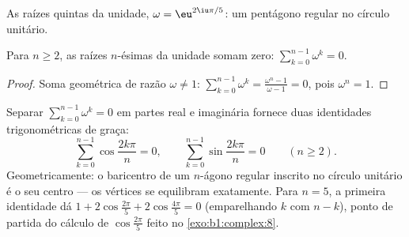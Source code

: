 \begin{omfigure}

{\small As raízes quintas da unidade, $\omega = \eu^{2\iu\pi/5}$: um
pentágono regular no círculo unitário.}
\end{omfigure}

\begin{proposition}\label{prop:b1:complex:sumroots}
Para $n \geq 2$, as raízes $n$-ésimas da unidade somam zero:
$\sum_{k=0}^{n-1} \omega^k = 0$.
\end{proposition}

\begin{proof}
Soma geométrica de razão $\omega \neq 1$:
$\sum_{k=0}^{n-1} \omega^k = \frac{\omega^n - 1}{\omega - 1} = 0$,
pois $\omega^n = 1$.
\end{proof}

\begin{example}\label{ex:b1:complex:sumrootsparts}
Separar $\sum_{k=0}^{n-1}\omega^k = 0$ em partes real e imaginária
fornece duas identidades trigonométricas de graça:
\[
\sum_{k=0}^{n-1}\cos\frac{2k\pi}n = 0,
\qquad
\sum_{k=0}^{n-1}\sin\frac{2k\pi}n = 0
\qquad (n \geq 2).
\]
Geometricamente: o baricentro de um $n$-ágono regular inscrito no
círculo unitário é o seu centro --- os vértices se equilibram
exatamente. Para $n = 5$, a primeira identidade dá $1 + 2\cos\frac{2\pi}5 +
2\cos\frac{4\pi}5 = 0$ (emparelhando $k$ com $n - k$), ponto de partida do
cálculo de $\cos\frac{2\pi}5$ feito no \cref{exo:b1:complex:8}.
\end{example}

